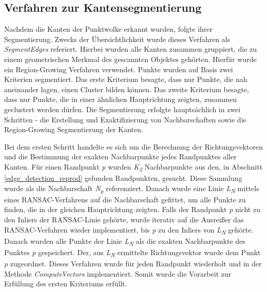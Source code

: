 \subsection{Verfahren zur Kantensegmentierung} \label{edge_segmentation}
Nachdem die Kanten der Punktwolke erkannt wurden, folgte ihrer Segmentierung. Zwecks der Übersichtlichkeit wurde dieses Verfahren als \textit{SegmentEdges} referiert. Hierbei wurden alle Kanten zusammen gruppiert, die zu einem geometrischen Merkmal des gescannten Objektes gehörten. Hierfür wurde ein Region-Growing Verfahren verwendet. Punkte wurden auf Basis zwei Kriterien segmentiert. Das erste Kriterium besagte, dass nur Punkte, die nah aneinander lagen, einen Cluster bilden können. Das zweite Kriterium besagte, dass nur Punkte, die in einer ähnlichen Hauptrichtung zeigten, zusammen geclustert werden dürfen. Die Segmentierung erfolgte hauptsächlich in zwei Schritten - die Erstellung und Exaktifizierung von Nachbarschaften sowie die Region-Growing Segmentierung der Kanten.

Bei dem ersten Schritt handelte es sich um die Berechnung der Richtungsvektoren und die Bestimmung der exakten Nachbarpunkte jedes Randpunktes aller Kanten. Für einen Randpunkt \textit{p} wurden \textit{K\textsubscript{2}} Nachbarpunkte aus den, in Abschnitt \ref{edge_detection_reprod} gefunden Randpunkten, gesucht. Diese Sammlung wurde als die Nachbarschaft \textit{N\textsubscript{p}} referenziert. Danach wurde eine Linie \textit{L\textsubscript{N}} mittels eines RANSAC-Verfahrens auf die Nachbarschaft gefittet, um alle Punkte zu finden, die in der gleichen Hauptrichtung zeigten. Falls der Randpunkt \textit{p} nicht zu den Inliers der RANSAC-Linie gehörte, wurde iterativ auf die Ausreißer das RANSAC-Verfahren wieder implementiert, bis \textit{p} zu den Inliers von \textit{L\textsubscript{N}} gehörte. Danach wurden alle Punkte der Linie \textit{L\textsubscript{N}} als die exakten Nachbarpunkte des Punktes \textit{p} gespeichert. Der, aus \textit{L\textsubscript{N}} ermittelte Richtungsvektor wurde dem Punkt \textit{p} zugeordnet. Dieses Verfahren wurde für jeden Randpunkt wiederholt und in der Methode \textit{ComputeVectors} implementiert. Somit wurde die Vorarbeit zur Erfüllung des ersten Kriteriums erfüllt.

